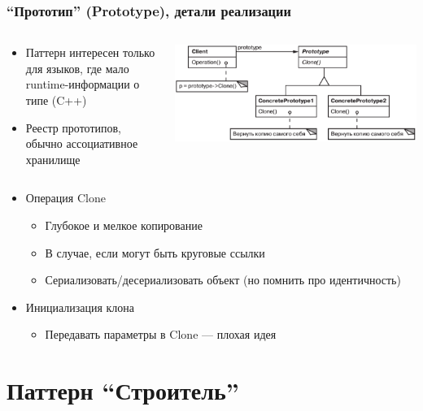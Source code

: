 \documentclass[xetex,mathserif,serif]{beamer}
\begin{document}
	\begin{frame}
		\frametitle{``Прототип'' (Prototype), детали реализации}
		\begin{columns}
			\begin{column}{0.45\textwidth}
				\begin{itemize}
					\item Паттерн интересен только для языков, где мало runtime-информации о типе (C++)
					\item Реестр прототипов, обычно ассоциативное хранилище
				\end{itemize}
			\end{column}
			\begin{column}{0.55\textwidth}
				\begin{center}
					\includegraphics[width=\textwidth]{prototype.png}
				\end{center}
			\end{column}
		\end{columns}
		\begin{itemize}
			\item Операция Clone
			\begin{itemize}
				\item Глубокое и мелкое копирование
				\item В случае, если могут быть круговые ссылки
				\item Сериализовать/десериализовать объект (но помнить про идентичность)
			\end{itemize}
			\item Инициализация клона
			\begin{itemize}
				\item Передавать параметры в Clone --- плохая идея
			\end{itemize}
		\end{itemize}
	\end{frame}

	\section{Паттерн ``Строитель''}
	
\end{document}
